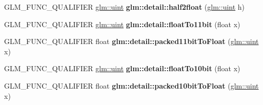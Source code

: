 \begin{DoxyCompactItemize}
\item 
\hypertarget{namespaceglm_1_1detail_a69b64ab4be52c9601b31588c8c813ca0}{G\-L\-M\-\_\-\-F\-U\-N\-C\-\_\-\-Q\-U\-A\-L\-I\-F\-I\-E\-R \hyperlink{group__core__precision_ga4fd29415871152bfb5abd588334147c8}{glm\-::uint} {\bfseries glm\-::detail\-::half2float} (\hyperlink{group__core__precision_ga4fd29415871152bfb5abd588334147c8}{glm\-::uint} h)}\label{namespaceglm_1_1detail_a69b64ab4be52c9601b31588c8c813ca0}

\item 
\hypertarget{namespaceglm_1_1detail_a62edbdbe89fe6282dd7909e6e4703796}{G\-L\-M\-\_\-\-F\-U\-N\-C\-\_\-\-Q\-U\-A\-L\-I\-F\-I\-E\-R \hyperlink{group__core__precision_ga4fd29415871152bfb5abd588334147c8}{glm\-::uint} {\bfseries glm\-::detail\-::float\-To11bit} (float x)}\label{namespaceglm_1_1detail_a62edbdbe89fe6282dd7909e6e4703796}

\item 
\hypertarget{namespaceglm_1_1detail_a0148d59bbb6dbf6c0f296e73a527c225}{G\-L\-M\-\_\-\-F\-U\-N\-C\-\_\-\-Q\-U\-A\-L\-I\-F\-I\-E\-R float {\bfseries glm\-::detail\-::packed11bit\-To\-Float} (\hyperlink{group__core__precision_ga4fd29415871152bfb5abd588334147c8}{glm\-::uint} x)}\label{namespaceglm_1_1detail_a0148d59bbb6dbf6c0f296e73a527c225}

\item 
\hypertarget{namespaceglm_1_1detail_a2be3138712a0811602a183614221ad5c}{G\-L\-M\-\_\-\-F\-U\-N\-C\-\_\-\-Q\-U\-A\-L\-I\-F\-I\-E\-R \hyperlink{group__core__precision_ga4fd29415871152bfb5abd588334147c8}{glm\-::uint} {\bfseries glm\-::detail\-::float\-To10bit} (float x)}\label{namespaceglm_1_1detail_a2be3138712a0811602a183614221ad5c}

\item 
\hypertarget{namespaceglm_1_1detail_afddea7fa02b61b01129777a21380edf4}{G\-L\-M\-\_\-\-F\-U\-N\-C\-\_\-\-Q\-U\-A\-L\-I\-F\-I\-E\-R float {\bfseries glm\-::detail\-::packed10bit\-To\-Float} (\hyperlink{group__core__precision_ga4fd29415871152bfb5abd588334147c8}{glm\-::uint} x)}\label{namespaceglm_1_1detail_afddea7fa02b61b01129777a21380edf4}


\end{DoxyCompactItemize}
